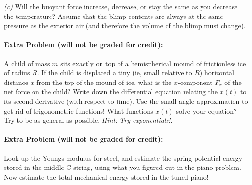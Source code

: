 \documentclass[12pt]{article}
\begin{document}
\textsl{(c)} Will the buoyant force increase, decrease, or stay the
same as you decrease the temperature?
Assume that the blimp contents are always at the same pressure as the
exterior air (and therefore the volume of the blimp must change).

\paragraph{Extra Problem (will not be graded for credit):}%
A child of mass $m$ sits exactly on top of a hemispherical mound of
frictionless ice of radius $R$.  If the child is displaced a tiny (ie,
small relative to $R$) horizontal distance $x$ from the top of the
mound of ice, what is the $x$-component $F_x$ of the net force on the
child?  Write down the differential equation relating the $x(t)$ to
its second derivative (with respect to time).  Use the small-angle
approximation to get rid of trigonometric functions! What functions
$x(t)$ solve your equation?  Try to be as general as possible.
\emph{Hint: Try exponentials!}.

\paragraph{Extra Problem (will not be graded for credit):}%
Look up the Youngs modulus for steel, and estimate the spring
potential energy stored in the middle C string, using what you figured
out in the piano problem. Now estimate the total mechanical energy
stored in the tuned piano!
\end{document}
